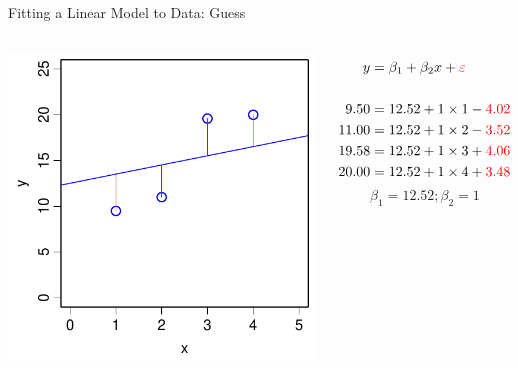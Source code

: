 \documentclass[xcolor=x11names,handout,compress]{beamer}
\renewcommand{\(}{\begin{columns}}
\renewcommand{\)}{\end{columns}}
\newcommand{\<}[1]{\begin{column}{#1}}
\renewcommand{\>}{\end{column}}
\begin{document}

\begin{frame}{Fitting a Linear Model to Data: Guess}
    \begin{columns}[T]
   
           \includegraphics[width=\textwidth]{TooFlat.pdf}
           
           \begin{align*}
             y  &= \beta_1 + \beta_2 x  + {\color{red} \varepsilon }\\
             \\
             9.50  &= 12.52 + 1 \times 1 - {\color{red} 4.02}\\
             11.00 &= 12.52 + 1 \times 2 - {\color{red} 3.52}\\
             19.58 &= 12.52 + 1 \times 3 + {\color{red} 4.06}\\
             20.00 &= 12.52 + 1 \times 4 + {\color{red} 3.48} 
           \end{align*}
           \[\beta_1 = 12.52; \beta_2=1\]
   
   \end{columns}
   \end{frame}
\end{document}
